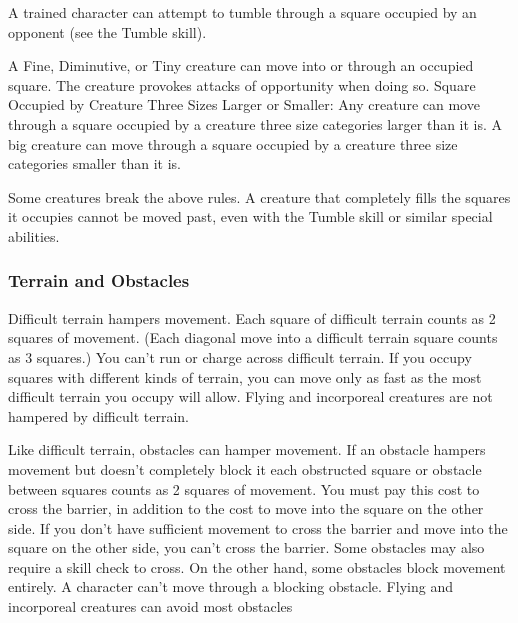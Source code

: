 A trained character can attempt to tumble through a square occupied by an opponent (see the Tumble skill).

A Fine, Diminutive, or Tiny creature can move into or through an occupied square. The creature provokes attacks of opportunity when doing so.
Square Occupied by Creature Three Sizes Larger or Smaller: Any creature can move through a square occupied by a creature three size categories larger than it is. A big creature can move through a square occupied by a creature three size categories smaller than it is.

Some creatures break the above rules. A creature that completely fills the squares it occupies cannot be moved past, even with the Tumble skill or similar special abilities.

\subsubsection{Terrain and Obstacles}

Difficult terrain hampers movement. Each square of difficult terrain counts as 2 squares of movement. (Each diagonal move into a difficult terrain square counts as 3 squares.) You can't run or charge across difficult terrain. If you occupy squares with different kinds of terrain, you can move only as fast as the most difficult terrain you occupy will allow. Flying and incorporeal creatures are not hampered by difficult terrain.

Like difficult terrain, obstacles can hamper movement. If an obstacle hampers movement but doesn't completely block it each obstructed square or obstacle between squares counts as 2 squares of movement. You must pay this cost to cross the barrier, in addition to the cost to move into the square on the other side. If you don't have sufficient movement to cross the barrier and move into the square on the other side, you can't cross the barrier. Some obstacles may also require a skill check to cross. On the other hand, some obstacles block movement entirely. A character can't move through a blocking obstacle. Flying and incorporeal creatures can avoid most obstacles

